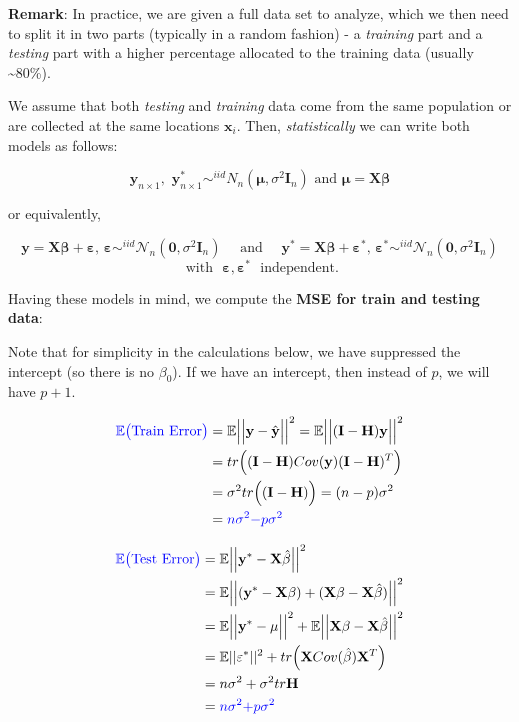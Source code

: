 \documentclass[
]{book}
\begin{document}
\textbf{Remark}: In practice, we are given a full data set to analyze, which we then need to split it in two parts (typically in a random fashion) - a \emph{training} part and a \emph{testing} part with a higher percentage allocated to the training data (usually \textasciitilde80\%).

We assume that both \emph{testing} and \emph{training} data come from the same population or are collected at the same locations \(\mathbf{x}_i\). Then, \emph{statistically} we can write both models as follows:

\[\mathbf{y}_{n\times 1},\,\,  \mathbf{y}^*_{n\times 1}  \sim^{iid} N_n(\mathbf{\mu},\sigma^2 \mathbf{I}_n) \text{ and } \mathbf{\mu}=\mathbf{X}\mathbf{\beta}\]

or equivalently,

\[ \mathbf{y} = \mathbf{X}\mathbf{\beta} + \mathbf{\varepsilon},\, \mathbf{\varepsilon} \sim^{iid} \mathcal{N}_n(\mathbf{0},\sigma^2 \mathbf{I}_n) \quad \text{ and } \quad \mathbf{y}^* =\mathbf{X}\mathbf{\beta} + \mathbf{\varepsilon}^*,\, \mathbf{\varepsilon}^* \sim^{iid} \mathcal{N}_n(\mathbf{0},\sigma^2 \mathbf{I}_n) \]
\[ \text{ with }\,\, \mathbf{\varepsilon},  \mathbf{\varepsilon}^* \,\,  \text{ independent}.\]

Having these models in mind, we compute the \textbf{MSE for train and testing data}:

Note that for simplicity in the calculations below, we have suppressed the intercept (so there is no \(\beta_0\)). If we have an intercept, then instead of \(p\), we will have \(p+1\).

\begin{align*}
{\color{blue} {\mathbb{E}\bigl(\text{Train Error}\bigr)}} & =  \mathbb{E}\Bigl|\Bigl|\mathbf{y}-\hat{\mathbf{y}} \Bigr|\Bigr|^2=\mathbb{E}\Bigl|\Bigl|(\mathbf{I - H})\mathbf{y}\Bigr|\Bigr|^2\\
  &=tr \Bigl((\mathbf{I - H})Cov(\mathbf{y})(\mathbf{I - H})^T \Bigr)\\
  & = \sigma^2 tr\Bigl( (\mathbf{I - H}) \Bigr)=  (n-p) \sigma^2\\
  &= {\color{blue} {n\sigma^2 \mathbf{-} p \sigma^2}}\\
\end{align*}

\begin{align*}
{\color{blue} {\mathbb{E}\bigl(\text{Test Error} \bigr)}} & = \mathbb{E}\Bigl|\Bigl|\mathbf{y}^*-\mathbf{X}\hat{\mathbf{\beta}}\Bigr|\Bigr|^2\\
&= \mathbb{E}\Bigl|\Bigl|(\mathbf{y}^*- \mathbf{X} \mathbf{\beta})+(\mathbf{X} \mathbf{\beta}-\mathbf{X}\hat{\mathbf{\beta}})\Bigr|\Bigr|^2\\
&= \mathbb{E}\Bigl|\Bigl|\mathbf{y}^* -\mathbf{\mu}\Bigr|\Bigr|^2 + \mathbb{E}\Bigl|\Bigl|\mathbf{X} \mathbf{\beta}-\mathbf{X}\hat{\mathbf{\beta}}\Bigr|\Bigr|^2\\
&= \mathbb{E}||\mathbf{\varepsilon}^*||^2 + tr\Bigl(\mathbf{X}Cov(\hat{\mathbf{\beta}})\mathbf{X}^T \Bigr)\\
&= n \sigma^2 +\sigma^2 tr\mathbf{H}\\
&= {\color{blue} {n \sigma^2 \mathbf{+}  p \sigma^2}}\\
\end{align*}
\end{document}
